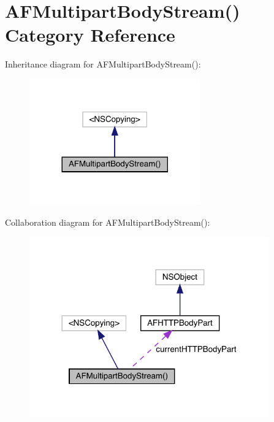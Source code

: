 \hypertarget{category_a_f_multipart_body_stream_07_08}{}\section{A\+F\+Multipart\+Body\+Stream() Category Reference}
\label{category_a_f_multipart_body_stream_07_08}


Inheritance diagram for A\+F\+Multipart\+Body\+Stream()\+:\nopagebreak
\begin{figure}[H]
\begin{center}
\leavevmode
\includegraphics[width=209pt]{category_a_f_multipart_body_stream_07_08__inherit__graph}
\end{center}
\end{figure}


Collaboration diagram for A\+F\+Multipart\+Body\+Stream()\+:\nopagebreak
\begin{figure}[H]
\begin{center}
\leavevmode
\includegraphics[width=293pt]{category_a_f_multipart_body_stream_07_08__coll__graph}
\end{center}
\end{figure}

